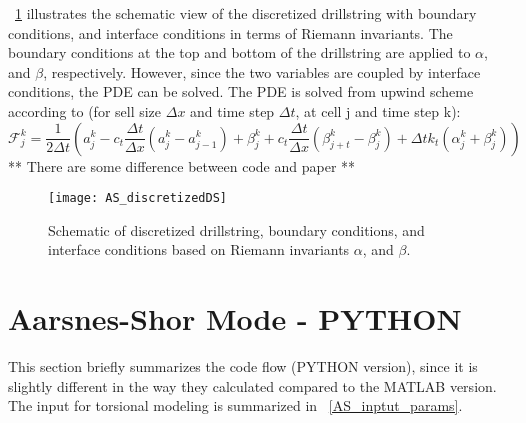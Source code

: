 \figurename~\ref{AS_discretizeDS} illustrates the schematic view of the discretized drillstring with boundary conditions, and interface conditions in terms of Riemann invariants. The boundary conditions at the top and bottom of the drillstring are applied to $\alpha$, and $\beta$, respectively. However, since the two variables are coupled by interface conditions, the PDE can be solved. 
The PDE is solved from upwind scheme according to (for sell size $\Delta x$ and time step $\Delta t$, at cell j and time step k):
\begin{equation}\label{AS-upwind}
  \mathcal{F}_{j}^k = \frac{1}{2 \Delta t}\left(a_j^k - c_t \frac{\Delta t}{\Delta x}(a_j^k - a_{j-1}^k) + \beta_j^k + c_t \frac{\Delta t}{\Delta x}(\beta_{j+t}^k-\beta_j^k) + \Delta t k_t (\alpha_j^k + \beta_j^k)\right)
\end{equation}
** There are some difference between code and paper **
\newpage
\begin{figure}[ht]
  \centering
  \texttt{[image: AS\_discretizedDS]}
  \caption[Schematic of discretized drillstring and boundary conditions]{Schematic of discretized drillstring, boundary conditions, and interface conditions based on Riemann invariants $\alpha$, and $\beta$.}\label{AS_discretizeDS}
\end{figure}
\section{Aarsnes-Shor Mode - PYTHON}
This section briefly summarizes the code flow (PYTHON version), since it is slightly different in the way they calculated compared to the MATLAB version. The input for torsional modeling is summarized in \tablename~\ref{AS_inptut_params}.

